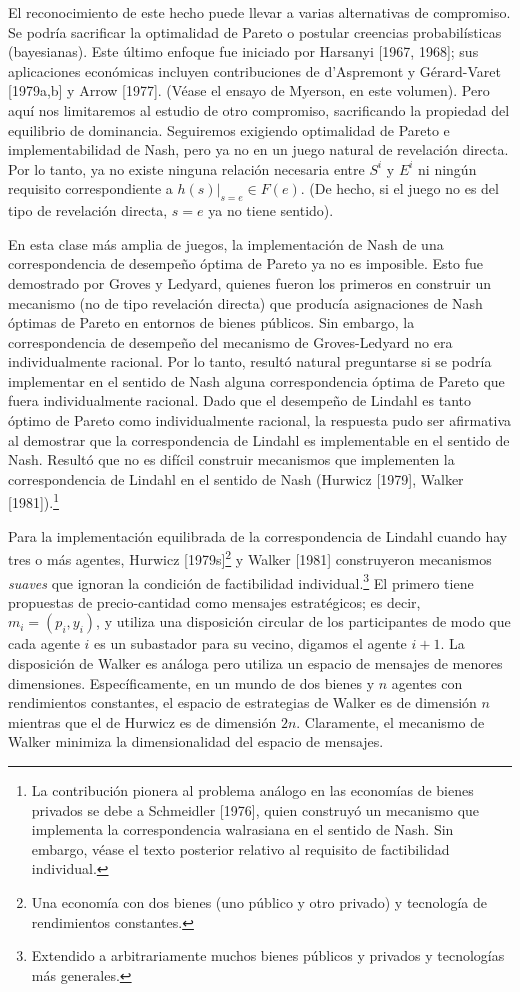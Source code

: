 \documentclass[12pt, letterpaper]{article}
\begin{document}
El reconocimiento de este hecho puede llevar a varias alternativas de compromiso. Se podría sacrificar la optimalidad de Pareto o postular creencias probabilísticas (bayesianas). Este último enfoque fue iniciado por Harsanyi [1967, 1968]; sus aplicaciones económicas incluyen contribuciones de d'Aspremont y Gérard-Varet [1979a,b] y Arrow [1977]. (Véase el ensayo de Myerson, en este volumen). Pero aquí nos limitaremos al estudio de otro compromiso, sacrificando la propiedad del equilibrio de dominancia. Seguiremos exigiendo optimalidad de Pareto e implementabilidad de Nash, pero ya no en un juego natural de revelación directa. Por lo tanto, ya no existe ninguna relación necesaria entre $S^i$ y $E^i$ ni ningún requisito correspondiente a $h(s)|_{s=e} \in F(e)$. (De hecho, si el juego no es del tipo de revelación directa, $s = e$ ya no tiene sentido).

En esta clase más amplia de juegos, la implementación de Nash de una correspondencia de desempeño óptima de Pareto ya no es imposible. Esto fue demostrado por Groves y Ledyard, quienes fueron los primeros en construir un mecanismo (no de tipo revelación directa) que producía asignaciones de Nash óptimas de Pareto en entornos de bienes públicos. Sin embargo, la correspondencia de desempeño del mecanismo de Groves-Ledyard no era individualmente racional. Por lo tanto, resultó natural preguntarse si se podría implementar en el sentido de Nash alguna correspondencia óptima de Pareto que fuera individualmente racional. Dado que el desempeño de Lindahl es tanto óptimo de Pareto como individualmente racional, la respuesta pudo ser afirmativa al demostrar que la correspondencia de Lindahl es implementable en el sentido de Nash. Resultó que no es difícil construir mecanismos que implementen la correspondencia de Lindahl en el sentido de Nash (Hurwicz [1979], Walker [1981]).\footnote{La contribución pionera al problema análogo en las economías de bienes privados se debe a Schmeidler [1976], quien construyó un mecanismo que implementa la correspondencia walrasiana en el sentido de Nash. Sin embargo, véase el texto posterior relativo al requisito de factibilidad individual.}

Para la implementación equilibrada de la correspondencia de Lindahl cuando hay tres o más agentes, Hurwicz [1979s]\footnote{Una economía con dos bienes (uno público y otro privado) y tecnología de rendimientos constantes.} y Walker [1981] construyeron mecanismos \textit{suaves} que ignoran la condición de factibilidad individual.\footnote{Extendido a arbitrariamente muchos bienes públicos y privados y tecnologías más generales.} El primero tiene propuestas de precio-cantidad como mensajes estratégicos; es decir, $m_i = (p_i, y_i)$, y utiliza una disposición circular de los participantes de modo que cada agente $i$ es un subastador para su vecino, digamos el agente $i + 1$. La disposición de Walker es análoga pero utiliza un espacio de mensajes de menores dimensiones. Específicamente, en un mundo de dos bienes y $n$ agentes con rendimientos constantes, el espacio de estrategias de Walker es de dimensión $n$ mientras que el de Hurwicz es de dimensión $2n$. Claramente, el mecanismo de Walker minimiza la dimensionalidad del espacio de mensajes.
\end{document}
